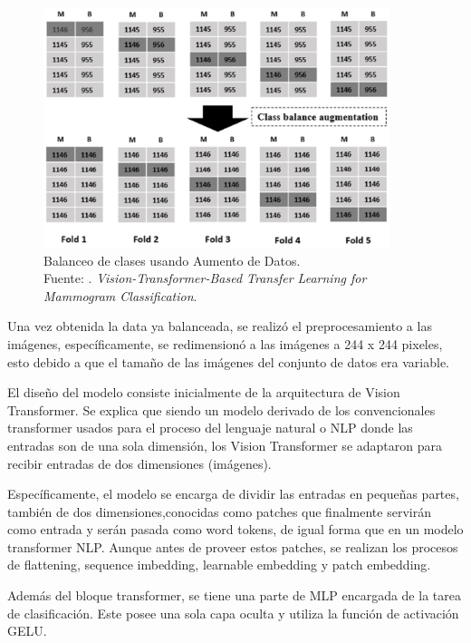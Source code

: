\begin{figure}[H]
	\begin{center}
		\includegraphics[width=0.90\textwidth]{2/figures/vitpaper2_part1.png}
		\caption[Balanceo de clases usando Aumento de Datos]{Balanceo de clases usando Aumento de Datos. \\
		Fuente: \cite{pr_ayana2023ViTtrasnferLMC}. \textit{Vision-Transformer-Based Transfer Learning for Mammogram Classification}.}
		\label{2:fig108}
	\end{center}
\end{figure}

Una vez obtenida la data ya balanceada, se realizó el preprocesamiento a las imágenes, específicamente, se redimensionó a las imágenes a 244 x 244 pixeles, esto debido a que el tamaño de las imágenes del conjunto de datos era variable. 

El diseño del modelo consiste inicialmente de la arquitectura de Vision Transformer. Se explica que siendo un modelo derivado de los convencionales transformer usados para el proceso del lenguaje natural o NLP donde las entradas son de una sola dimensión, los Vision Transformer se adaptaron para recibir entradas de dos dimensiones (imágenes). 

Específicamente, el modelo se encarga de dividir las entradas en pequeñas partes, también de dos dimensiones,conocidas como patches que finalmente servirán como entrada y serán pasada como word tokens, de igual forma que en un modelo transformer NLP. Aunque antes de proveer estos patches, se realizan los procesos de flattening, sequence imbedding, learnable embedding y patch embedding.

Además del bloque transformer, se tiene una parte de MLP encargada de la tarea de clasificación. Este posee una sola capa oculta y utiliza la función de activación GELU.

